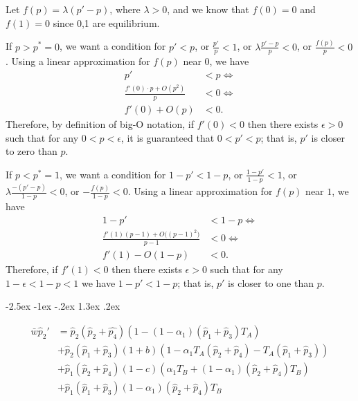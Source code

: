 \documentclass[12pt]{extarticle}
\makeatletter
\renewcommand\section{\@startsection {section}{1}{\z@}%
     {-2.5ex \@plus -1ex \@minus -.2ex}%
     {1.3ex \@plus.2ex}%
    {\Large\bfseries}}
\makeatother
\begin{document}
{\begin{appendices}
Let $f(p)=\lambda(p'-p)$, where $\lambda>0$, and we know that $f(0)=0$ and $f(1)=0$ since 0,1 are equilibrium.

If $p>p^*=0$, we want a condition for $p'<p$, or
$\frac{p'}{p}<1$, or
$\lambda \frac{p'-p}{p} < 0$, or
$\frac{f(p)}{p} < 0$.
Using a linear approximation for $f(p)$ near $0$, we have
\begin{equation}\begin{aligned}
p' &< p \Leftrightarrow \\
\frac{f'(0) \cdot p + O(p^2)}{p} &< 0 \Leftrightarrow \\
f'(0) + O(p) &< 0.
\end{aligned}\end{equation}
Therefore, by definition of big-O notation, if $f'(0)<0$ then there exists $\epsilon>0$ such that for any $0<p<\epsilon$, it is guaranteed that $0<p'<p$; that is, $p'$ is closer to zero than $p$.

If $p<p^*=1$, we want a condition for $1-p' < 1-p$, or
$\frac{1-p'}{1-p}<1$, or
$\lambda \frac{-(p'-p)}{1-p} < 0$, or
$-\frac{f(p)}{1-p} < 0$.
Using a linear approximation for $f(p)$ near $1$, we have
\begin{equation}\begin{aligned}
1-p' &< 1-p  \Leftrightarrow \\
\frac{f'(1)(p-1) + O\big((p-1)^2\big)}{p-1} &< 0 \Leftrightarrow \\
f'(1) - O(1-p) &< 0.
\end{aligned}\end{equation}
Therefore, if $f'(1)<0$ then there exists $\epsilon>0$ such that for any $1-\epsilon<1-p<1$ we have $1-p'<1-p$; that is, $p'$ is closer to one than $p$.

\section{} \label{sec:appendixC}

\begin{equation} \label{eq:next_gen_p_2}
  \begin{aligned}
  \bar{w}\hat{p}_2' & = \hat{p}_2(\hat{p}_2+\hat{p_4})(1 - (1-\alpha_1)(\hat{p}_1 + \hat{p}_3)T_A) \\
  &+ \hat{p}_2(\hat{p}_1 + \hat{p}_3)(1+b)(1-\alpha_1T_A(\hat{p}_2 + \hat{p}_4)-T_A(\hat{p}_1 + \hat{p}_3))\\
  &+ \hat{p}_1(\hat{p}_2 + \hat{p}_4)(1-c)(\alpha_1T_B + (1-\alpha_1)(\hat{p}_2+\hat{p}_4)T_B) \\
  &+ \hat{p}_1(\hat{p}_1 + \hat{p}_3)(1-\alpha_1)(\hat{p}_2+\hat{p}_4)T_B 
  \end{aligned}
\end{equation}


\end{appendices}}
\end{document}
